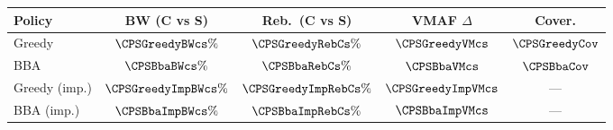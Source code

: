 \begin{tabularx}{\linewidth}{@{}>{\raggedright\arraybackslash}X cccc@{}}
\toprule
\textbf{Policy} & \textbf{BW (C vs S)} & \textbf{Reb.\ (C vs S)} & \textbf{VMAF \(\Delta\)} & \textbf{Cover.} \\
\midrule
Greedy & \(\CPSGreedyBWcs\%\) & \(\CPSGreedyRebCs\%\) & \(\CPSGreedyVMcs\) & \(\CPSGreedyCov\) \\
BBA & \(\CPSBbaBWcs\%\) & \(\CPSBbaRebCs\%\) & \(\CPSBbaVMcs\) & \(\CPSBbaCov\) \\
\midrule
Greedy (imp.) & \(\CPSGreedyImpBWcs\%\) & \(\CPSGreedyImpRebCs\%\) & \(\CPSGreedyImpVMcs\) & --- \\
BBA (imp.) & \(\CPSBbaImpBWcs\%\) & \(\CPSBbaImpRebCs\%\) & \(\CPSBbaImpVMcs\) & --- \\
\bottomrule
\end{tabularx}
